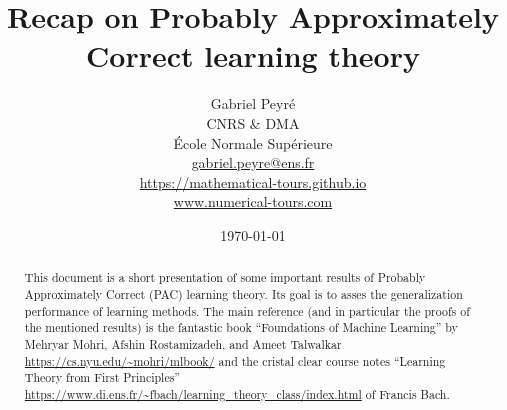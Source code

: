 \documentclass[10pt]{article}
\title{Recap on Probably Approximately Correct learning  theory}
\author{%
\begin{tabular}{c}
	Gabriel Peyr{\'e} \\ CNRS \& DMA \\
	 \'Ecole Normale Sup\'erieure \\
	 \url{gabriel.peyre@ens.fr}\\
	 \url{https://mathematical-tours.github.io}\\
	 \url{www.numerical-tours.com}
\end{tabular}
}
\date{\today}
\begin{document}
\maketitle

\begin{abstract}
		This document is a short presentation of some important results of Probably Approximately Correct (PAC) learning theory. Its goal is to asses the generalization performance of learning methods. The main reference (and in particular the proofs of the mentioned results) is the fantastic book ``Foundations of Machine Learning'' by Mehryar Mohri, Afshin Rostamizadeh, and Ameet Talwalkar \url{https://cs.nyu.edu/~mohri/mlbook/} and the cristal clear course notes ``Learning Theory from First Principles'' \url{https://www.di.ens.fr/~fbach/learning_theory_class/index.html} of Francis Bach.
\end{abstract}

\vspace{5mm}
 







\end{document}
